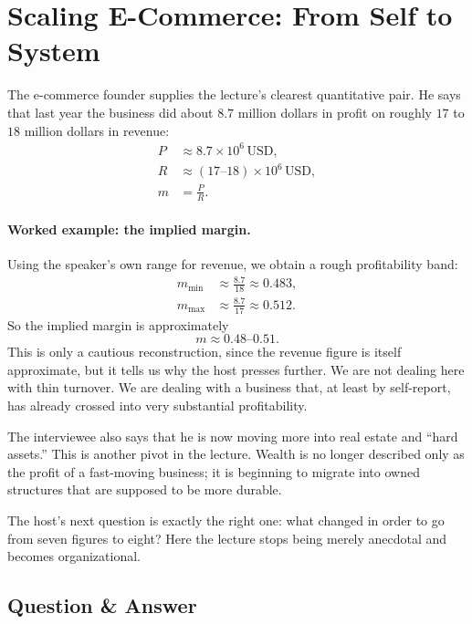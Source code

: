 \section{Scaling E-Commerce: From Self to System}

The e-commerce founder supplies the lecture's clearest quantitative pair. He says that last year the business did about \(8.7\) million dollars in profit on roughly \(17\) to \(18\) million dollars in revenue:
\begin{align}
P &\approx 8.7 \times 10^6 \,\mathrm{USD},\\
R &\approx (17\text{--}18) \times 10^6 \,\mathrm{USD},\\
m &= \frac{P}{R}.
\end{align}

\paragraph{Worked example: the implied margin.}
Using the speaker's own range for revenue, we obtain a rough profitability band:
\begin{align}
m_{\min} &\approx \frac{8.7}{18} \approx 0.483,\\
m_{\max} &\approx \frac{8.7}{17} \approx 0.512.
\end{align}
So the implied margin is approximately
\begin{equation}
m \approx 0.48\text{--}0.51.
\end{equation}
This is only a cautious reconstruction, since the revenue figure is itself approximate, but it tells us why the host presses further. We are not dealing here with thin turnover. We are dealing with a business that, at least by self-report, has already crossed into very substantial profitability.

The interviewee also says that he is now moving more into real estate and ``hard assets.'' This is another pivot in the lecture. Wealth is no longer described only as the profit of a fast-moving business; it is beginning to migrate into owned structures that are supposed to be more durable.

The host's next question is exactly the right one: what changed in order to go from seven figures to eight? Here the lecture stops being merely anecdotal and becomes organizational.

\subsection{Question \& Answer}

